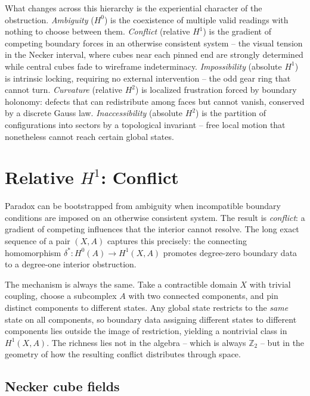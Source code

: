 \documentclass[11pt]{amsart}  %
\theoremstyle{plain}
\theoremstyle{definition}
\theoremstyle{remark}
\newcommand{\style}[1]{{\em #1}} %
\newcommand{\connecting}{\delta^*} %
\newcommand{\Z}{\mathbb{Z}} %
\begin{document}
What changes across this hierarchy is the experiential character of the obstruction. \emph{Ambiguity} ($H^0$) is the coexistence of multiple valid readings with nothing to choose between them. \emph{Conflict} (relative $H^1$) is the gradient of competing boundary forces in an otherwise consistent system -- the visual tension in the Necker interval, where cubes near each pinned end are strongly determined while central cubes fade to wireframe indeterminacy. \emph{Impossibility} (absolute $H^1$) is intrinsic locking, requiring no external intervention -- the odd gear ring that cannot turn. \emph{Curvature} (relative $H^2$) is localized frustration forced by boundary holonomy: defects that can redistribute among faces but cannot vanish, conserved by a discrete Gauss law. \emph{Inaccessibility} (absolute $H^2$) is the partition of configurations into sectors by a topological invariant -- free local motion that nonetheless cannot reach certain global states.


\section{Relative $H^1$: Conflict}
\label{sec:relH^1}

Paradox can be bootstrapped from ambiguity when incompatible boundary conditions are imposed on an otherwise consistent system. The result is \style{conflict}: a gradient of competing influences that the interior cannot resolve. The long exact sequence of a pair $(X, A)$ captures this precisely: the connecting homomorphism $\connecting: H^0(A) \to H^1(X, A)$ promotes degree-zero boundary data to a degree-one interior obstruction.

The mechanism is always the same. Take a contractible domain $X$ with trivial coupling, choose a subcomplex $A$ with two connected components, and pin distinct components to different states. Any global state restricts to the \emph{same} state on all components, so boundary data assigning different states to different components lies outside the image of restriction, yielding a nontrivial class in $H^1(X, A)$. The richness lies not in the algebra -- which is always $\Z_2$ -- but in the geometry of how the resulting conflict distributes through space.

\subsection{Necker cube fields}
\label{sec:necker-boundary}
\end{document}
